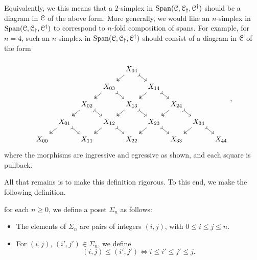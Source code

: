 \documentclass[main.tex]{subfiles}
\begin{document}
Equivalently, we this means that a $2$-simplex in $\mathrm{Span}(\mathcal{C}, \mathcal{C}_{\dagger}, \mathcal{C}^{\dagger})$ should be a diagram in $\mathcal{C}$ of the above form. More generally, we would like an $n$-simplex in $\mathrm{Span}(\mathcal{C}, \mathcal{C}_{\dagger}, \mathcal{C}^{\dagger})$ to correspond to $n$-fold composition of spans. For example, for $n = 4$, such an $n$-simplex in $\mathrm{Span}(\mathcal{C}, \mathcal{C}_{\dagger}, \mathcal{C}^{\dagger})$ should consist of a diagram in $\mathcal{C}$ of the form
\begin{equation*}
  \begin{tikzcd}[column sep=tiny, row sep=small]
    \\
    &&&& X_{04}
    \arrow[dl, two heads]
    \arrow[dr, tail]
    \\
    &&& X_{03}
    \arrow[dl, two heads]
    \arrow[dr, tail]
    && X_{14}
    \arrow[dl, two heads]
    \arrow[dr, tail]
    \\
    && X_{02}
    \arrow[dl, two heads]
    \arrow[dr, tail]
    && X_{13}
    \arrow[dl, two heads]
    \arrow[dr, tail]
    && X_{24}
    \arrow[dl, two heads]
    \arrow[dr, tail]
    \\
    & X_{01}
    \arrow[dl, two heads]
    \arrow[dr, tail]
    && X_{12}
    \arrow[dl, two heads]
    \arrow[dr, tail]
    && X_{23}
    \arrow[dl, two heads]
    \arrow[dr, tail]
    && X_{34}
    \arrow[dl, two heads]
    \arrow[dr, tail]
    \\
    X_{00}
    && X_{11}
    && X_{22}
    && X_{33}
    && X_{44}
  \end{tikzcd},
\end{equation*}
where the morphisms are ingressive and egressive as shown, and each square is pullback.

All that remains is to make this definition rigorous. To this end, we make the following definition.

\begin{definition}
  for each $n \geq 0$, we define a poset $\Sigma_{n}$ as follows:
  \begin{itemize}
    \item The elements of $\Sigma_{n}$ are pairs of integers $(i, j)$, with $0 \leq i \leq j \leq n$.
  
    \item For $(i, j)$, $(i', j') \in \Sigma_{n}$, we define
      \begin{equation*}
        (i, j) \leq (i', j') \iff i \leq i' \leq j' \leq j.
      \end{equation*}
  \end{itemize}
\end{definition}
\end{document}
